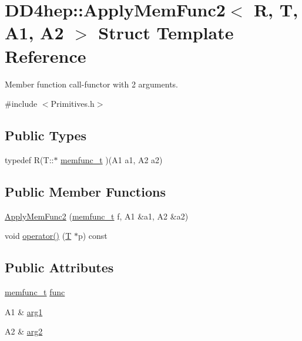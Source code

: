 \hypertarget{struct_d_d4hep_1_1_apply_mem_func2}{
\section{DD4hep::ApplyMemFunc2$<$ R, T, A1, A2 $>$ Struct Template Reference}
\label{struct_d_d4hep_1_1_apply_mem_func2}
}


Member function call-\/functor with 2 arguments.  


{\ttfamily \#include $<$Primitives.h$>$}\subsection*{Public Types}
\begin{DoxyCompactItemize}
\item 
typedef R(T::$\ast$ \hyperlink{struct_d_d4hep_1_1_apply_mem_func2_add321da903f05b6e55a390aba10c3363}{memfunc\_\-t} )(A1 a1, A2 a2)
\end{DoxyCompactItemize}
\subsection*{Public Member Functions}
\begin{DoxyCompactItemize}
\item 
\hyperlink{struct_d_d4hep_1_1_apply_mem_func2_a0ba82d9b15161c878526ffc012f449f6}{ApplyMemFunc2} (\hyperlink{struct_d_d4hep_1_1_apply_mem_func2_add321da903f05b6e55a390aba10c3363}{memfunc\_\-t} f, A1 \&a1, A2 \&a2)
\item 
void \hyperlink{struct_d_d4hep_1_1_apply_mem_func2_a2e2508f40e969ecf92735ea969efb1bb}{operator()} (\hyperlink{class_t}{T} $\ast$p) const 
\end{DoxyCompactItemize}
\subsection*{Public Attributes}
\begin{DoxyCompactItemize}
\item 
\hyperlink{struct_d_d4hep_1_1_apply_mem_func2_add321da903f05b6e55a390aba10c3363}{memfunc\_\-t} \hyperlink{struct_d_d4hep_1_1_apply_mem_func2_a7fc130521dd8099937693fdf25eaaaaf}{func}
\item 
A1 \& \hyperlink{struct_d_d4hep_1_1_apply_mem_func2_a07f0ada96e3eb80a5934f530c994b3c2}{arg1}
\item 
A2 \& \hyperlink{struct_d_d4hep_1_1_apply_mem_func2_a2c9f7dbd482c849c53ee6f499d6a0713}{arg2}
\end{DoxyCompactItemize}


